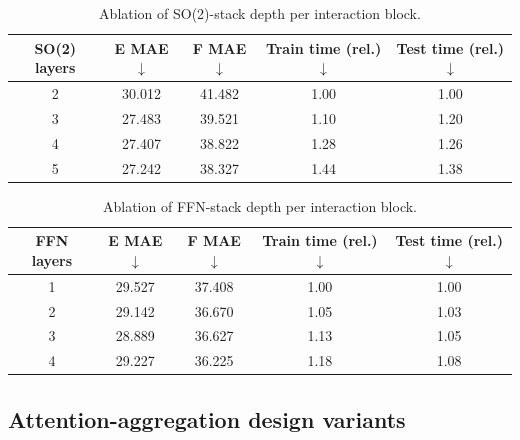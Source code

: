 \begin{table}[ht]
    \centering
    \scriptsize
    \caption{Ablation of SO(2)-stack depth per interaction block.}
    \label{tab:sm_so2_stack}
    \begin{tabular*}{\linewidth}{@{\extracolsep{\fill}}ccccc@{}}
        \toprule
        \textbf{SO(2) layers}             &
        \textbf{E MAE}$\downarrow$        &
        \textbf{F MAE}$\downarrow$        &
        \textbf{Train time (rel.)}$\downarrow$ &
        \textbf{Test time (rel.)}$\downarrow$                             \\
        \midrule
        2                                 & 30.012 & 41.482 & 1.00 & 1.00 \\
        3                                 & 27.483 & 39.521 & 1.10 & 1.20 \\
        4                                 & 27.407 & 38.822 & 1.28 & 1.26 \\
        5                                 & 27.242 & 38.327 & 1.44 & 1.38 \\
        \bottomrule
    \end{tabular*}
\end{table}

\begin{table}[ht]
    \centering
    \scriptsize
    \caption{Ablation of FFN-stack depth per interaction block.}
    \label{tab:sm_ffn_stack}
    \begin{tabular*}{\linewidth}{@{\extracolsep{\fill}}ccccc@{}}
        \toprule
        \textbf{FFN layers}              &
        \textbf{E MAE}$\downarrow$       &
        \textbf{F MAE}$\downarrow$       &
        \textbf{Train time (rel.)}$\downarrow$ &
        \textbf{Test time (rel.)}$\downarrow$                             \\
        \midrule
        1                                & 29.527 & 37.408 & 1.00 & 1.00 \\
        2                                & 29.142 & 36.670 & 1.05 & 1.03 \\
        3                                & 28.889 & 36.627 & 1.13 & 1.05 \\
        4                                & 29.227 & 36.225 & 1.18 & 1.08 \\
        \bottomrule
    \end{tabular*}
\end{table}

\FloatBarrier
\subsection{Attention-aggregation design variants}

